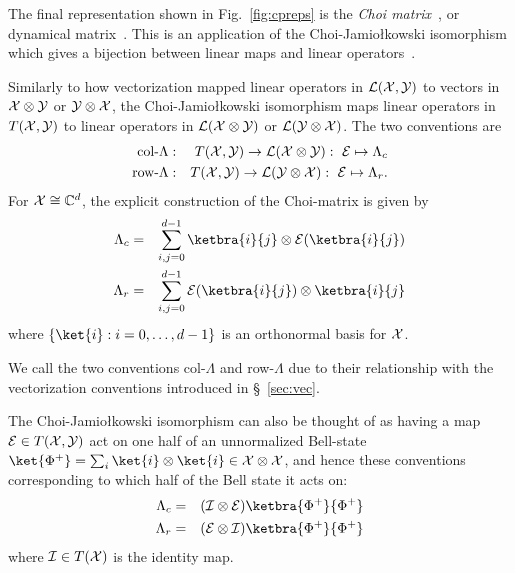 The final representation shown in Fig.~\ref{fig:cpreps} is the \emph{Choi matrix}~\cite{Choi1975}, or dynamical matrix~\cite{Bengtsson2006}. This is an application of the Choi-Jamio{\l}kowski isomorphism which gives a bijection between linear maps and linear operators~\cite{Jamiolkowski1972}.
\begin{definition}
Similarly to how vectorization mapped linear operators in ${\mathcal L}({\cal X},{\cal Y})$ to vectors in $\mathcal{X}\otimes\mathcal{Y}$ or $\mathcal{Y}\otimes\mathcal{X}$, the Choi-Jamio{\l}kowski isomorphism maps linear operators in $T({\cal X},{\cal Y})$ to linear operators in ${\mathcal L}({\cal X}\otimes{\cal Y})$ or ${\mathcal L}({\cal Y}\otimes{\cal X})$. 
The two conventions are
\begin{eqnarray}
\mbox{col-}\Lambda&:& 
	T({\cal X},{\cal Y})\rightarrow {\mathcal L}({\cal X}\otimes{\cal Y}):\,\, {\cal E}\mapsto \Lambda_c\\
\mbox{row-}\Lambda&:& 
	T({\cal X},{\cal Y})\rightarrow {\mathcal L}({\cal Y}\otimes{\cal X}):\,\, {\cal E}\mapsto \Lambda_r.
\end{eqnarray}
For ${\cal X}\cong{\mathbb C}^d$, the explicit construction of the Choi-matrix is given by
\begin{eqnarray} 
	\label{eqn:col-choi}
	\Lambda_c &=& \sum_{i,j=0}^{d-1}
	 \ketbra{i}{j}\otimes\2 E(\ketbra{i}{j})\\
	\Lambda_r &=& \sum_{i,j=0}^{d-1}
	 \2 E(\ketbra{i}{j})\otimes\ketbra{i}{j}
\end{eqnarray}
where $\{\ket{i}:i=0,\hdots,d-1\}$ is an orthonormal basis for ${\cal X}$.

\end{definition}



We call the two conventions col-$\Lambda$ and row-$\Lambda$ due to their relationship with the vectorization conventions introduced in \S~\ref{sec:vec}. 
\begin{definition}
The Choi-Jamio{\l}kowski isomorphism can also be thought of as having a map ${\cal E}\in T({\cal X},{\cal Y})$ act on one half of an unnormalized Bell-state $\ket{\Phi^+}=\sum_i \ket{i}\otimes\ket{i} \in \2X\otimes\2X$, and hence these conventions corresponding to which half of the Bell state it acts on:
\begin{eqnarray} 
	\Lambda_c &=& (\2 I \otimes \2 E)\ketbra{\Phi^+}{\Phi^+}\label{eqn:jamiolkowski}\\
	\Lambda_r &=& (\2 E \otimes \2 I)\ketbra{\Phi^+}{\Phi^+}
\end{eqnarray}
where ${\cal I}\in T({\cal X})$ is the identity map. 
\end{definition}


